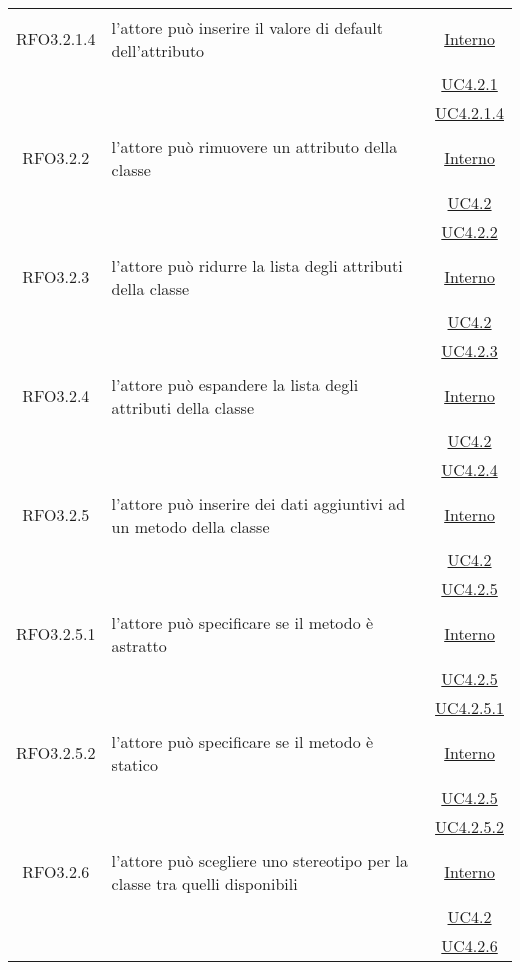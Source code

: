 \begin{longtable}{|c|>{\centering}m{7cm}|c|}
\hypertarget{RFO3.2.1.4}{RFO3.2.1.4} & l'attore può inserire il valore di default dell'attributo & \hyperlink{Interno}{Interno}\\
& &\hyperref[UC4.2.1]{UC4.2.1}\\
& &\hyperref[UC4.2.1.4]{UC4.2.1.4}\\ \hline

\hypertarget{RFO3.2.2}{RFO3.2.2} & l'attore può rimuovere un attributo della classe & \hyperlink{Interno}{Interno}\\
& &\hyperref[UC4.2]{UC4.2}\\
& &\hyperref[UC4.2.2]{UC4.2.2}\\ \hline

\hypertarget{RFO3.2.3}{RFO3.2.3} & l'attore può ridurre la lista degli attributi della classe & \hyperlink{Interno}{Interno}\\
& &\hyperref[UC4.2]{UC4.2}\\
& &\hyperref[UC4.2.3]{UC4.2.3}\\ \hline

\hypertarget{RFO3.2.4}{RFO3.2.4} & l'attore può espandere la lista degli attributi della classe & \hyperlink{Interno}{Interno}\\
& &\hyperref[UC4.2]{UC4.2}\\
& &\hyperref[UC4.2.4]{UC4.2.4}\\ \hline

\hypertarget{RFO3.2.5}{RFO3.2.5} & l'attore può inserire dei dati aggiuntivi ad un metodo della classe & \hyperlink{Interno}{Interno}\\
& &\hyperref[UC4.2]{UC4.2}\\
& &\hyperref[UC4.2.5]{UC4.2.5}\\ \hline

\hypertarget{RFO3.2.5.1}{RFO3.2.5.1} & l'attore può specificare se il metodo è astratto & \hyperlink{Interno}{Interno}\\
& &\hyperref[UC4.2.5]{UC4.2.5}\\
& &\hyperref[UC4.2.5.1]{UC4.2.5.1}\\ \hline

\hypertarget{RFO3.2.5.2}{RFO3.2.5.2} & l'attore può specificare se il metodo è statico & \hyperlink{Interno}{Interno}\\
& &\hyperref[UC4.2.5]{UC4.2.5}\\
& &\hyperref[UC4.2.5.2]{UC4.2.5.2}\\ \hline

\hypertarget{RFO3.2.6}{RFO3.2.6} & l'attore può scegliere uno stereotipo per la classe tra quelli disponibili & \hyperlink{Interno}{Interno}\\
& &\hyperref[UC4.2]{UC4.2}\\
& &\hyperref[UC4.2.6]{UC4.2.6}\\ \hline


\end{longtable}
